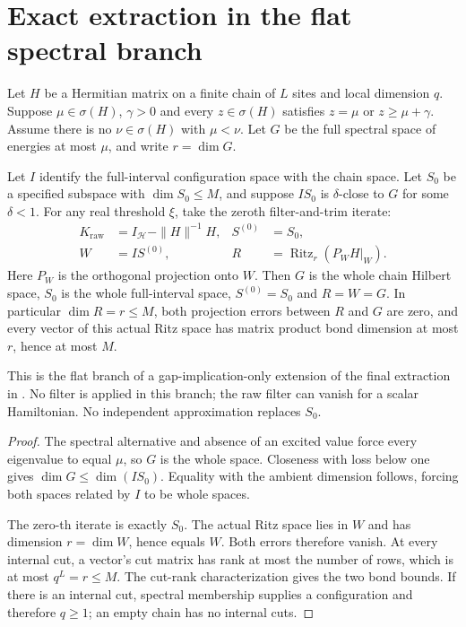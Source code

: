 \section{Exact extraction in the flat spectral branch}

\begin{lemma}
    \label{thm:flat_ground_same_root_ritz}
    \leanok
    Let $H$ be a Hermitian matrix on a finite chain of $L$ sites and
    local dimension $q$. Suppose $\mu\in\sigma(H)$, $\gamma>0$ and
    every $z\in\sigma(H)$ satisfies $z=\mu$ or $z\ge\mu+\gamma$.
    Assume there is no $\nu\in\sigma(H)$ with $\mu<\nu$.
    Let $G$ be the full spectral space of energies at most $\mu$,
    and write $r=\dim G$.

    Let $I$ identify the full-interval configuration space with the chain
    space. Let $S_0$ be a specified subspace with $\dim S_0\le M$, and
    suppose $I S_0$ is $\delta$-close to $G$ for some $\delta<1$.
    For any real threshold $\xi$, take the zeroth filter-and-trim iterate:
    \begin{align}
        K_{\mathrm{raw}} & =I_{\mathcal H}-\|H\|^{-1}H,      &
        S^{(0)}          & =S_0,                               \\
        W                & =I S^{(0)},                       &
        R                & =\operatorname{Ritz}_r(P_W H|_W).
    \end{align}
    Here $P_W$ is the orthogonal projection onto $W$.
    Then $G$ is the whole chain Hilbert space, $S_0$ is the whole
    full-interval space, $S^{(0)}=S_0$ and $R=W=G$. In particular
    $\dim R=r\le M$, both projection errors between $R$ and $G$ are
    zero, and every vector of this actual Ritz space has matrix product
    bond dimension at most $r$, hence at most $M$.

    This is the flat branch of a gap-implication-only extension of the
    final extraction in
    \cite[Figure~\texttt{fig:algo1}, lines 1641--1643 and 1814--1817]{Arad2016RigorousRG}.
    No filter is applied in this branch; the raw filter can vanish for
    a scalar Hamiltonian. No independent approximation replaces $S_0$.
\end{lemma}
\begin{proof}\leanok
    The spectral alternative and absence of an excited value force every
    eigenvalue to equal $\mu$, so $G$ is the whole space. Closeness with
    loss below one gives $\dim G\le\dim(I S_0)$.
    Equality with the ambient dimension follows, forcing both spaces
    related by $I$ to be whole spaces.

    The zero-th iterate is exactly $S_0$. The actual Ritz space lies in
    $W$ and has dimension $r=\dim W$, hence equals $W$. Both errors
    therefore vanish. At every internal cut, a vector's cut matrix has
    rank at most the number of rows, which is at most $q^L=r\le M$.
    The cut-rank characterization gives the two bond bounds. If there
    is an internal cut, spectral membership supplies a configuration
    and therefore $q\ge1$; an empty chain has no internal cuts.
\end{proof}


